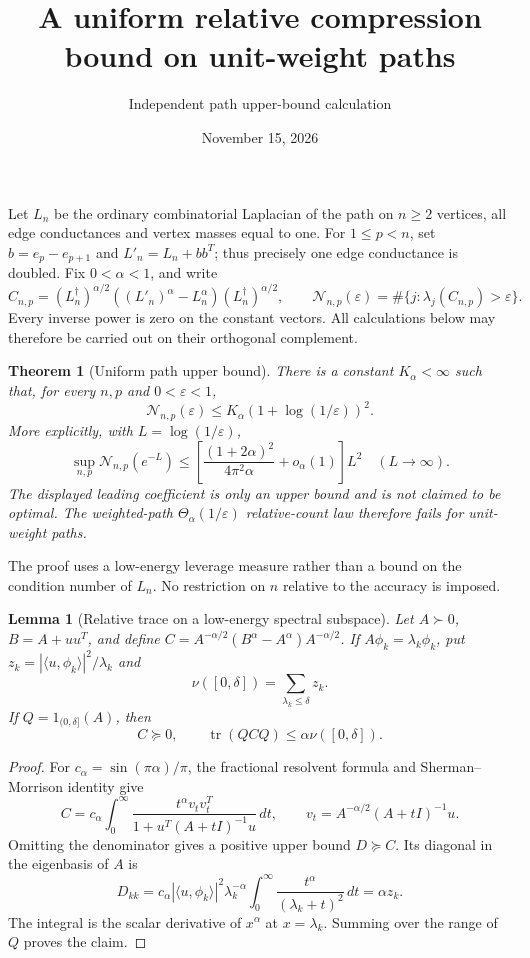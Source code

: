\documentclass[11pt]{article}
\title{A uniform relative compression bound on unit-weight paths}
\author{Independent path upper-bound calculation}
\date{November 15, 2026}
\newtheorem{theorem}{Theorem}
\newtheorem{lemma}{Lemma}
\newcommand{\tr}{\operatorname{tr}}
\newcommand{\N}{\mathcal N}
\begin{document}
\maketitle

Let $L_n$ be the ordinary combinatorial Laplacian of the path on
$n\ge2$ vertices, all edge conductances and vertex masses equal to one.
For $1\le p<n$, set $b=e_p-e_{p+1}$ and $L'_n=L_n+bb^T$; thus precisely
one edge conductance is doubled. Fix $0<\alpha<1$, and write
\[
 C_{n,p}=(L_n^\dagger)^{\alpha/2}
       ((L'_n)^\alpha-L_n^\alpha)(L_n^\dagger)^{\alpha/2},\qquad
 \N_{n,p}(\varepsilon)=\#\{j:\lambda_j(C_{n,p})>\varepsilon\}.
\]
Every inverse power is zero on the constant vectors. All calculations
below may therefore be carried out on their orthogonal complement.

\begin{theorem}[Uniform path upper bound]\label{thm:path}
There is a constant $K_\alpha<\infty$ such that, for every $n,p$ and
$0<\varepsilon<1$,
\[
 \N_{n,p}(\varepsilon)
       \le K_\alpha(1+\log(1/\varepsilon))^2.
\]
More explicitly, with $L=\log(1/\varepsilon)$,
\[
 \sup_{n,p}\N_{n,p}(e^{-L})
 \le\left[\frac{(1+2\alpha)^2}{4\pi^2\alpha}+o_\alpha(1)\right]L^2
 \quad(L\longrightarrow\infty).
\]
The displayed leading coefficient is only an upper bound and is not
claimed to be optimal. The weighted-path
$\Theta_\alpha(1/\varepsilon)$ relative-count law therefore fails for
unit-weight paths.
\end{theorem}

The proof uses a low-energy leverage measure rather than a bound on
the condition number of $L_n$. No restriction on $n$ relative to the
accuracy is imposed.

\begin{lemma}[Relative trace on a low-energy spectral subspace]
Let $A\succ0$, $B=A+uu^T$, and define
$C=A^{-\alpha/2}(B^\alpha-A^\alpha)A^{-\alpha/2}$. If
$A\phi_k=\lambda_k\phi_k$, put $z_k=|\langle u,\phi_k\rangle|^2/\lambda_k$
and
\[
 \nu([0,\delta])=\sum_{\lambda_k\le\delta}z_k.
\]
If $Q=1_{(0,\delta]}(A)$, then
\[
 C\succeq0,\qquad \tr(QCQ)\le\alpha\nu([0,\delta]).
\]
\end{lemma}
\begin{proof}
For $c_\alpha=\sin(\pi\alpha)/\pi$, the fractional resolvent formula
and Sherman--Morrison identity give
\[
 C=c_\alpha\int_0^\infty
 \frac{t^\alpha v_t v_t^T}{1+u^T(A+tI)^{-1}u}\,dt,
 \qquad v_t=A^{-\alpha/2}(A+tI)^{-1}u.
\]
Omitting the denominator gives a positive upper bound $D\succeq C$.
Its diagonal in the eigenbasis of $A$ is
\[
 D_{kk}=c_\alpha|\langle u,\phi_k\rangle|^2\lambda_k^{-\alpha}
       \int_0^\infty\frac{t^\alpha}{(\lambda_k+t)^2}\,dt
       =\alpha z_k.
\]
The integral is the scalar derivative of $x^\alpha$ at
$x=\lambda_k$. Summing over the range of $Q$ proves the claim.
\end{proof}
\end{document}
